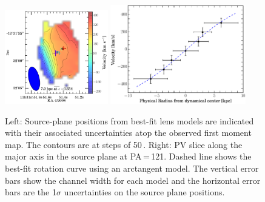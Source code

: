 \documentclass[]{emulateapj}
\begin{document}
\begin{figure}[!htbp]
\centering
\includegraphics[trim=0 0 30 0, clip, width=0.4\textwidth]{../Figures/veloGradient_markers}
\includegraphics[width=0.525\textwidth]{../Figures/bestfit_PV.eps}
\caption{Left: Source-plane positions from best-fit \bco lens models are indicated with their associated uncertainties atop
the observed first moment map. The contours are at steps of 50\,\kms.
Right: PV slice along the major axis in the source plane at PA\,=\,121\degr.
Dashed line shows the best-fit rotation curve using an arctangent model.
The vertical error bars show the channel width for
each model and the horizontal error bars are the
1$\sigma$ uncertainties on the source plane positions.
 \label{fig:PV}}
\end{figure}
\end{document}
